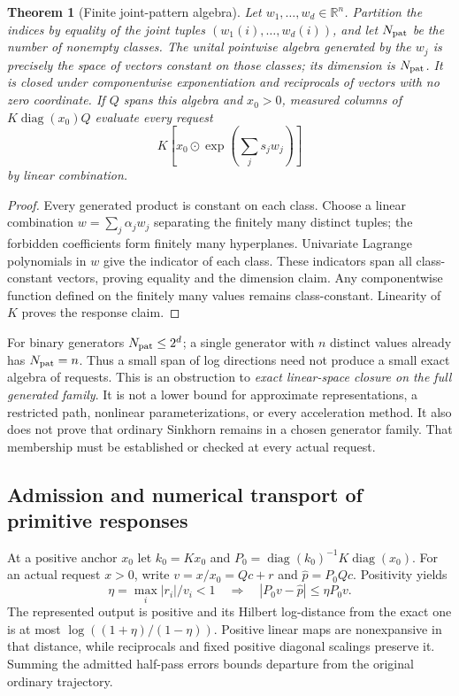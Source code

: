 \documentclass[journal]{IEEEtran}
\newtheorem{theorem}{Theorem}
\theoremstyle{definition}
\newcommand{\R}{\mathbb{R}}
\DeclareMathOperator{\diag}{diag}
\begin{document}
\begin{theorem}[Finite joint-pattern algebra]\label{thm:patterns}
Let $w_1,\ldots,w_d\in\R^n$. Partition the indices by equality of the
joint tuples $(w_1(i),\ldots,w_d(i))$, and let $N_{\rm pat}$ be the number of
nonempty classes. The unital pointwise algebra generated by the $w_j$
is precisely the space of vectors constant on those classes; its dimension
is $N_{\rm pat}$. It is closed under componentwise exponentiation and reciprocals
of vectors with no zero coordinate. If $Q$ spans this algebra and $x_0>0$,
measured columns of $K\diag(x_0)Q$ evaluate every request
\[
 K\left[x_0\odot\exp\!\left(\sum_j s_jw_j\right)\right]
\]
by linear combination.
\end{theorem}
\begin{proof}
Every generated product is constant on each class. Choose a linear
combination $w=\sum_j\alpha_jw_j$ separating the finitely many distinct
tuples; the forbidden coefficients form finitely many hyperplanes.
Univariate Lagrange polynomials in $w$ give the indicator of each class.
These indicators span all class-constant vectors, proving equality and the
dimension claim. Any componentwise function defined on the finitely many
values remains class-constant. Linearity of $K$ proves the response claim.
\end{proof}
For binary generators $N_{\rm pat}\leq2^d$; a single generator with $n$ distinct
values already has $N_{\rm pat}=n$. Thus a small span of log directions need not
produce a small exact algebra of requests. This is an obstruction to
\emph{exact linear-space closure on the full generated family}. It is not
a lower bound for approximate representations, a restricted path, nonlinear
parameterizations, or every acceleration method. It also does not prove that
ordinary Sinkhorn remains in a chosen generator family. That membership
must be established or checked at every actual request.

\subsection{Admission and numerical transport of primitive responses}
At a positive anchor $x_0$ let $k_0=Kx_0$ and
$P_0=\diag(k_0)^{-1}K\diag(x_0)$. For an actual request $x>0$, write
$v=x/x_0=Qc+r$ and $\widehat p=P_0Qc$. Positivity yields
\begin{equation}
 \eta=\max_i|r_i|/v_i<1
 \quad\Longrightarrow\quad
 |P_0v-\widehat p|\leq\eta P_0v.\label{eq:primitive-admit}
\end{equation}
The represented output is positive and its Hilbert log-distance from the
exact one is at most $\log((1+\eta)/(1-\eta))$.
Positive linear maps are nonexpansive in that distance, while reciprocals
and fixed positive diagonal scalings preserve it. Summing the admitted
half-pass errors bounds departure from the original ordinary trajectory.
\end{document}
